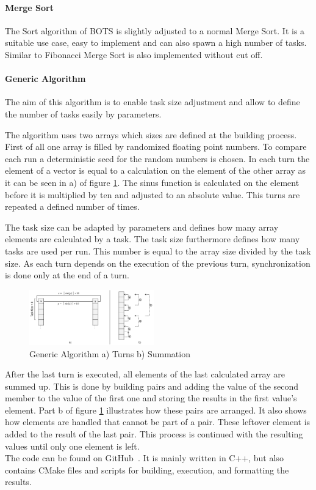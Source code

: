   \paragraph{Merge Sort}
  The Sort algorithm of BOTS is slightly adjusted to a normal Merge Sort.
  It is a suitable use case, easy to implement and can also spawn a high number of tasks.
  Similar to Fibonacci Merge Sort is also implemented without cut off. 
  \\
  
  \paragraph{Generic Algorithm}
  The aim of this algorithm is to enable task size adjustment and allow to define the number of tasks easily by parameters.
  
  The algorithm uses two arrays which sizes are defined at the building process.
  First of all one array is filled by randomized floating point numbers.
  To compare each run a deterministic seed for the random numbers is chosen.
  In each turn the element of a vector is equal to a calculation on the element of the other array as it can be seen in a) of figure \ref{fig:gen_algo}.
  The sinus function is calculated on the element before it is multiplied by ten and adjusted to an absolute value.
  This turns are repeated a defined number of times.
  
  The task size can be adapted by parameters and defines how many array elements are calculated by a task.
  The task size furthermore defines how many tasks are used per run.
  This number is equal to the array size divided by the task size.
  As each turn depends on the execution of the previous turn, synchronization is done only at the end of a turn.
    
\begin{figure}[htbp]
	\centering
	\includegraphics[width=0.48\textwidth]{figures/generic_alorithm.PNG}
	\caption{Generic Algorithm a) Turns b) Summation}
	\label{fig:gen_algo}
\end{figure}

  After the last turn is executed, all elements of the last calculated array are summed up.
  This is done by building pairs and adding the value of the second member to the value of the first one and storing the results in the first value's element.
  Part b of figure \ref{fig:gen_algo} illustrates how these pairs are arranged.
  It also shows how elements are handled that cannot be part of a pair.
  These leftover element is added to the result of the last pair.
  This process is continued with the resulting values until only one element is left.
\\

The code can be found on GitHub~\cite{t0BEE.2020}.
It is mainly written in C++, but also contains CMake files and scripts for building, execution, and formatting the results.
